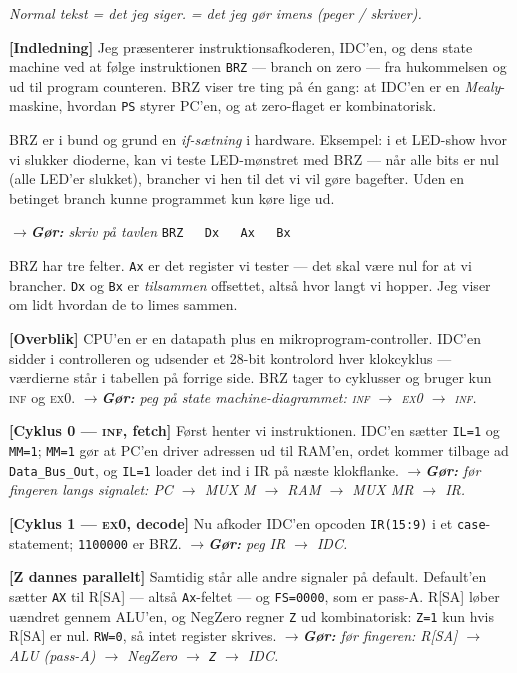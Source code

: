 \documentclass[11pt,a4paper]{article}
\newcommand{\gor}[1]{{\color{accent!90}\itshape$\rightarrow$\;\textbf{Gør:} #1}}
\begin{document}
\textit{Normal tekst = det jeg siger.}\quad\gor{...} \textit{= det jeg gør imens (peger / skriver).}

\textbf{[Indledning]} Jeg præsenterer instruktionsafkoderen, IDC'en, og dens state machine ved at
følge instruktionen \texttt{BRZ} --- branch on zero --- fra hukommelsen og ud til program
counteren. BRZ viser tre ting på én gang: at IDC'en er en \emph{Mealy}-maskine, hvordan
\texttt{PS} styrer PC'en, og at zero-flaget er kombinatorisk.

BRZ er i bund og grund en \emph{if-sætning} i hardware. Eksempel: i et LED-show hvor vi slukker
dioderne, kan vi teste LED-mønstret med BRZ --- når alle bits er nul (alle LED'er slukket),
brancher vi hen til det vi vil gøre bagefter. Uden en betinget branch kunne programmet kun køre
lige ud.

\gor{skriv på tavlen} \quad\texttt{BRZ\ \ \ Dx\ \ \ Ax\ \ \ Bx}

BRZ har tre felter. \texttt{Ax} er det register vi tester --- det skal være nul for at vi
brancher. \texttt{Dx} og \texttt{Bx} er \emph{tilsammen} offsettet, altså hvor langt vi hopper.
Jeg viser om lidt hvordan de to limes sammen.

\textbf{[Overblik]} CPU'en er en datapath plus en mikroprogram-controller. IDC'en sidder i
controlleren og udsender et 28-bit kontrolord hver klokcyklus --- værdierne står i tabellen på
forrige side. BRZ tager to cyklusser og bruger kun \textsc{inf} og \textsc{ex0}.
\gor{peg på state machine-diagrammet: \textsc{inf} $\to$ \textsc{ex0} $\to$ \textsc{inf}.}

\textbf{[Cyklus 0 --- \textsc{inf}, fetch]} Først henter vi instruktionen. IDC'en sætter
\texttt{IL=1} og \texttt{MM=1}; \texttt{MM=1} gør at PC'en driver adressen ud til RAM'en, ordet
kommer tilbage ad \texttt{Data\_Bus\_Out}, og \texttt{IL=1} loader det ind i IR på næste
klokflanke.
\gor{før fingeren langs signalet: PC $\to$ MUX M $\to$ RAM $\to$ MUX MR $\to$ IR.}

\textbf{[Cyklus 1 --- \textsc{ex0}, decode]} Nu afkoder IDC'en opcoden \texttt{IR(15:9)} i et
\texttt{case}-statement; \texttt{1100000} er BRZ.
\gor{peg IR $\to$ IDC.}

\textbf{[Z dannes parallelt]} Samtidig står alle andre signaler på default. Default'en sætter
\texttt{AX} til R[SA] --- altså \texttt{Ax}-feltet --- og \texttt{FS=0000}, som er pass-A. R[SA]
løber uændret gennem ALU'en, og NegZero regner \texttt{Z} ud kombinatorisk: \texttt{Z=1} kun hvis
R[SA] er nul. \texttt{RW=0}, så intet register skrives.
\gor{før fingeren: R[SA] $\to$ ALU (pass-A) $\to$ NegZero $\to$ \texttt{Z} $\to$ IDC.}
\end{document}
